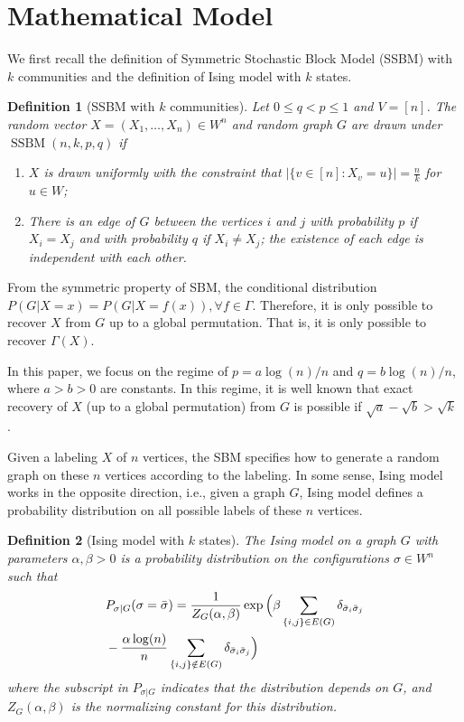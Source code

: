 \documentclass[conference]{IEEEtran}
\newtheorem{definition}{Definition}%
\DeclareMathOperator{\SSBM}{SSBM}
\newcommand{\ide}[2]{ \delta_{#1 #2} }
\begin{document}
\section{Mathematical Model} \label{s:Preliminaries}
We first recall the definition of Symmetric Stochastic Block Model (SSBM) with $k$ communities \cite{Abbe17} and the definition of Ising model with $k$ states.
\begin{definition}[SSBM with $k$ communities] \label{def:SSBM}
Let $0\leq q<p\leq 1$ and $V=[n]$. The random vector $X=(X_1,\dots,X_n)\in W^n$ and random graph $G$ are drawn under $\SSBM(n,k,p,q)$ if
\begin{enumerate}
\item $X$ is drawn uniformly with the constraint that $|\{v \in [n] : X_v = u\}| = \frac{n}{k}$ for $u\in W$;

\item There is an edge of $G$ between the vertices $i$ and $j$ with probability $p$ if $X_i=X_j$ and with probability $q$ if $X_i \neq X_j$; the existence of each edge is independent with each other.
\end{enumerate}
\end{definition}
From the symmetric property of SBM, the conditional distribution $P(G|X=x) = P(G|X=f(x)), \forall f \in \Gamma$. Therefore, it is only possible to recover $X$ from $G$ up to a global permutation. That is, it is only possible to recover $\Gamma(X)$.

In this paper, we focus on the regime of $p=a\log(n)/n$ and $q=b\log(n)/n$, where $a>b> 0$ are constants. In this regime, it is well known that exact recovery of $X$ (up to a global permutation) from $G$ is possible if $\sqrt{a}-\sqrt{b} > \sqrt{k}$ \cite{abbe2015community}.
 
Given a labeling $X$ of $n$ vertices, the SBM specifies how to generate a random graph on these $n$ vertices according to the labeling. In some sense, Ising model works in the opposite direction, i.e., given a graph $G$, Ising model defines a probability distribution on all possible labels of these $n$ vertices. 

 
\begin{definition}[Ising model with $k$ states]
The Ising model on a graph $G$ with parameters $\alpha,\beta>0$ is a probability distribution on the configurations $\sigma\in W^n$ such that
\begin{align} \label{eq:isingma}
&P_{\sigma|G}(\sigma=\bar{\sigma})=\frac{1}{Z_G(\alpha,\beta)}
\exp\Big(\beta \sum_{\{i,j\}\in E(G)} \ide{\bar{\sigma}_i}{\bar{\sigma}_j}\notag\\
&-\frac{\alpha\log(n)}{n} \sum_{\{i,j\}\notin E(G)} \ide{\bar{\sigma}_i}{\bar{\sigma}_j}
\Big)
\end{align}
where the subscript in $P_{\sigma|G}$ indicates that the distribution depends on $G$, and
$Z_G(\alpha,\beta)$ is the normalizing constant for this distribution.
\end{definition}
\end{document}
